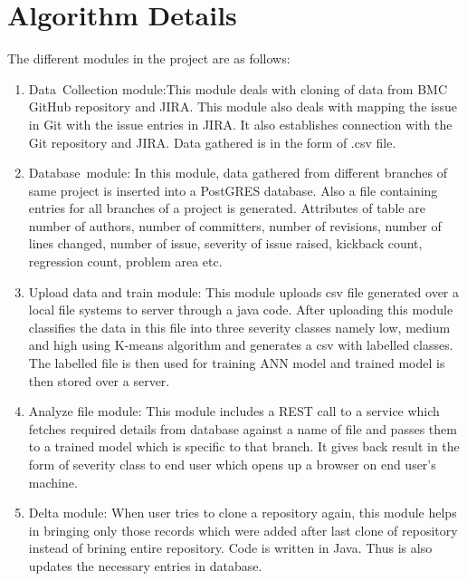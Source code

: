 \documentclass[oneside,a4paper,12pt]{book}
\begin{document}
\section{Algorithm Details}

The different modules in the project are as follows:\par

\setlength{\parskip}{0.0pt}
\begin{enumerate}
	\item Data\ Collection module:This module deals with cloning of data from BMC GitHub repository and JIRA. This module also deals with mapping the issue in Git with the issue entries in JIRA.  It also establishes connection with the Git repository and JIRA. Data gathered is in the form of .csv file.\par

	\item Database\ module: In this module, data gathered from different branches of  same project is inserted into a PostGRES database. Also a file containing entries for all branches of a project is generated. Attributes of table are number of authors, number of committers, number of revisions, number of lines changed, number of issue, severity of issue raised, kickback count, regression count, problem area etc.\par

	\item Upload data and train module: This module uploads csv file generated over a local file systems to server through a java code. After uploading this module classifies the data in this file into three severity classes namely low, medium and high using K-means algorithm and generates a csv with labelled classes. The labelled file is then used for training ANN model and trained model is then stored over a server.\par

	\item Analyze file module: This module includes a REST call to a service which fetches required details from database against a name of file and passes them to a trained model which is specific to that branch. It gives back result in the form of severity class to end user which opens up a browser on end user’s machine.\par

	\item Delta module: When user tries to clone a repository again, this module helps in bringing only those records which were added after last clone of repository instead of brining entire repository. Code is written in Java. Thus is also updates the necessary entries in database.
\end{enumerate}\par
\end{document}
